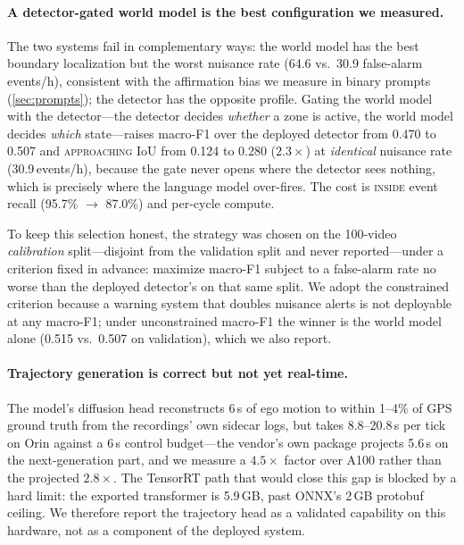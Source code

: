 \paragraph{A detector-gated world model is the best configuration we measured.}  The two systems fail in complementary ways: the world model has the best boundary localization but the worst nuisance rate (64.6 vs.\ 30.9 false-alarm events/h), consistent with the affirmation bias we measure in binary prompts (\cref{sec:prompts}); the detector has the opposite profile.  Gating the world model with the detector---the detector decides \emph{whether} a zone is active, the world model decides \emph{which} state---raises macro-F1 over the deployed detector from 0.470 to 0.507 and \textsc{approaching} IoU from 0.124 to 0.280 ($2.3\times$) at \emph{identical} nuisance rate (30.9\,events/h), because the gate never opens where the detector sees nothing, which is precisely where the language model over-fires.  The cost is \textsc{inside} event recall (95.7\% $\rightarrow$ 87.0\%) and per-cycle compute.

To keep this selection honest, the strategy was chosen on the 100-video \emph{calibration} split---disjoint from the validation split and never reported---under a criterion fixed in advance: maximize macro-F1 subject to a false-alarm rate no worse than the deployed detector's on that same split.  We adopt the constrained criterion because a warning system that doubles nuisance alerts is not deployable at any macro-F1; under unconstrained macro-F1 the winner is the world model alone (0.515 vs.\ 0.507 on validation), which we also report.

\paragraph{Trajectory generation is correct but not yet real-time.}  The model's diffusion head reconstructs 6\,s of ego motion to within 1--4\% of GPS ground truth from the recordings' own sidecar logs, but takes 8.8--20.8\,s per tick on Orin against a 6\,s control budget---the vendor's own package projects 5.6\,s on the next-generation part, and we measure a $4.5\times$ factor over A100 rather than the projected $2.8\times$.  The TensorRT path that would close this gap is blocked by a hard limit: the exported transformer is 5.9\,GB, past ONNX's 2\,GB protobuf ceiling.  We therefore report the trajectory head as a validated capability on this hardware, not as a component of the deployed system.
